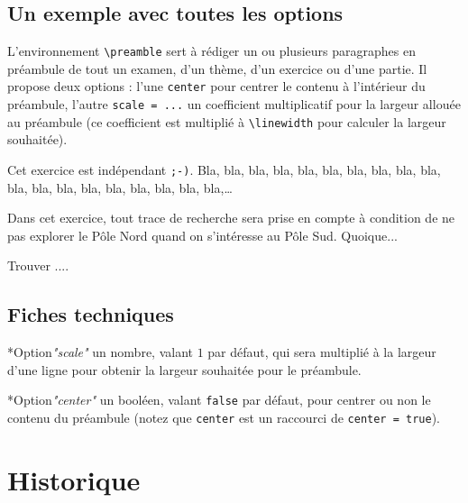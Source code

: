 \documentclass[12pt,a4paper]{scrartcl}
\makeatletter
\theoremstyle{definition}
\newcommand\resetallcnt{
    	\setcounter{lyxam@counter@topic}{0}
    	\setcounter{lyxam@counter@exercise}{0}
    	\setcounter{lyxam@counter@problem}{0}
    	\setcounter{lyxam@counter@bonus}{0}
    	\setcounter{lyxam@counter@subpart}{0}
    }
\newcommand\IDenv{\@ifstar{\@IDenvStar}{\@IDenvNoStar}}
\newcommand\@IDenvNoStar[3]{%
    \texttt{%
    	\textbackslash#1%
    	\IfStrEq{#2}{0}{}{%
    		\,\,[#2 Option%
			\IfStrEq{#2}{1}{}{s}]%
		}%
	    \IfStrEq{#3}{}{}{%
    		\,\,(#3 Argument%
			\IfStrEq{#3}{1}{}{s})%
		}
   	}
    \immediate\write\tempfile{env@#1@#2@#3}%
}
\newcommand\@IDenvStar[2]{%
    \@IDenvNoStar{#1}{0}{#2}%
}
\newcommand\@IDoptarg{\@ifstar{\@IDoptargStar}{\@IDoptargNoStar}}
\newcommand\@IDoptargStar[2]{%
	\vspace{0.5em}
	--- \texttt{#1%
		\IfStrEq{#2}{}{:}{\,#2:}%
	}%
}
\newcommand\@IDoptargNoStar[2]{%
	\IfStrEq{#2}{}{%
		\@IDoptargStar{#1}{}%
	}{%
		\@IDoptargStar{#1}{\##2}%
	}%
}
\newcommand\IDkey[1]{%
	\@IDoptarg*{Option}{{\itshape "#1"}}%
}
\makeatother
\begin{document}
    \subsection{Un exemple avec toutes les options}

L'environnement \verb+\preamble+ sert à rédiger un ou plusieurs paragraphes en préambule de tout un examen, d'un thème, d'un exercice ou d'une partie.
Il propose deux options : l'une \verb+center+ pour centrer le contenu à l'intérieur du préambule, l'autre \verb+scale = ...+ un coefficient multiplicatif pour la largeur allouée au préambule (ce coefficient est multiplié à \verb+\linewidth+ pour calculer la largeur souhaitée).

\resetallcnt{}

\begin{tcblisting}{}
\begin{preamble}[scale = 0.75, center]
    Cet exercice est indépendant \verb+;-)+. Bla, bla, bla, bla, bla, bla,
    bla, bla, bla, bla, bla, bla, bla, bla, bla, bla, bla, bla, bla,\dots
\end{preamble}

\exercise

\begin{preamble}
    Dans cet exercice, tout trace de recherche sera prise en compte à
    condition de ne pas explorer le Pôle Nord quand on s'intéresse
    au Pôle Sud. Quoique...
\end{preamble}

Trouver ....
\end{tcblisting}


    \subsection{Fiches techniques}

\IDenv{preamble}{2}{}

\IDkey{scale} un nombre, valant $1$ par défaut, qui sera multiplié à la largeur d'une ligne pour obtenir la largeur souhaitée pour le préambule.

\IDkey{center} un booléen, valant \verb+false+ par défaut, pour centrer ou non le contenu du préambule (notez que \verb+center+ est un raccourci de \verb+center = true+).





\section{Historique}
\end{document}
